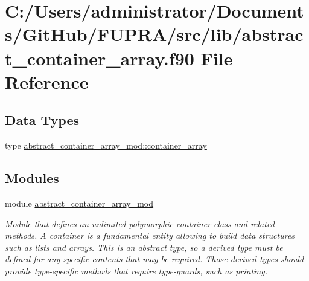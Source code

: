 \hypertarget{abstract__container__array_8f90}{}\section{C\+:/\+Users/administrator/\+Documents/\+Git\+Hub/\+F\+U\+P\+R\+A/src/lib/abstract\+\_\+container\+\_\+array.f90 File Reference}
\label{abstract__container__array_8f90}
\subsection*{Data Types}
\begin{DoxyCompactItemize}
\item 
type \hyperlink{structabstract__container__array__mod_1_1container__array}{abstract\+\_\+container\+\_\+array\+\_\+mod\+::container\+\_\+array}
\end{DoxyCompactItemize}
\subsection*{Modules}
\begin{DoxyCompactItemize}
\item 
module \hyperlink{namespaceabstract__container__array__mod}{abstract\+\_\+container\+\_\+array\+\_\+mod}
\begin{DoxyCompactList}\small\item\em Module that defines an unlimited polymorphic container class and related methods. A container is a fundamental entity allowing to build data structures such as lists and arrays. This is an abstract type, so a derived type must be defined for any specific contents that may be required. Those derived types should provide type-\/specific methods that require type-\/guards, such as printing. \end{DoxyCompactList}\end{DoxyCompactItemize}
